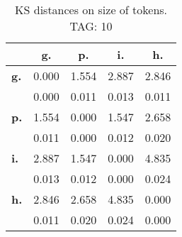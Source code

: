 \begin{table}[h!]
\begin{center}
\begin{tabular}{| l || c | c | c | c |}\hline
 & {\bf g.} & {\bf p.} & {\bf i.} & {\bf h.} \\\hline\hline
{\bf g.} & 0.000 & 1.554 & 2.887 & 2.846 \\
{\bf } & 0.000 & 0.011 & 0.013 & 0.011 \\\hline
{\bf p.} & 1.554 & 0.000 & 1.547 & 2.658 \\
{\bf } & 0.011 & 0.000 & 0.012 & 0.020 \\\hline
{\bf i.} & 2.887 & 1.547 & 0.000 & 4.835 \\
{\bf } & 0.013 & 0.012 & 0.000 & 0.024 \\\hline
{\bf h.} & 2.846 & 2.658 & 4.835 & 0.000 \\
{\bf } & 0.011 & 0.020 & 0.024 & 0.000 \\\hline
\end{tabular}
\caption{KS distances on size of tokens. TAG: 10}
\end{center}
\end{table}